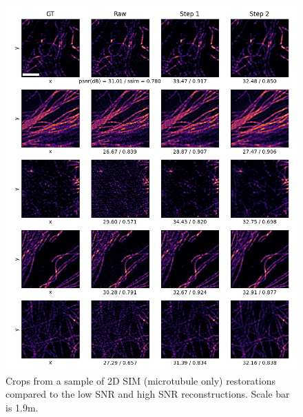 \documentclass[12pt]{article}
\begin{document}
\begin{figure}[hbtp]
    \includegraphics[scale=0.75, center]{figures/m019_m020_reconstruction_samples.png}
    \caption{Crops from a sample of 2D SIM (microtubule only) restorations compared to the low SNR and high SNR reconstructions.
    Scale bar is 1.9\textmu m.}
    \label{fig:2D_mo_further_samples}
\end{figure}
\end{document}
